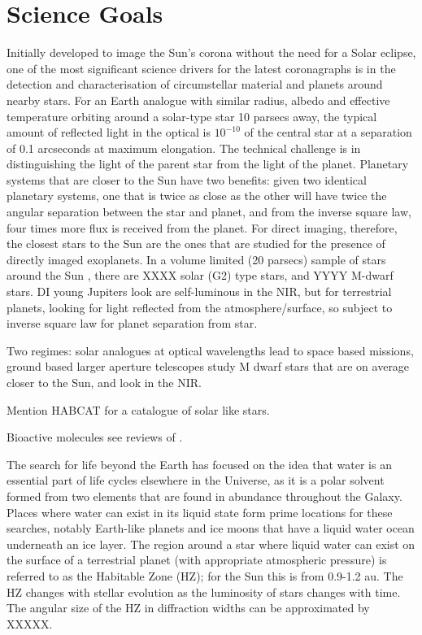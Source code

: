 \documentclass[letterpaper]{ar-1col}
\begin{document}
\section{Science Goals}

Initially developed to image the Sun's corona without the need for a Solar eclipse, one of the most significant science drivers for the latest coronagraphs is in the detection and characterisation of circumstellar material and planets around nearby stars.
%
%
For an Earth analogue with similar radius, albedo and effective temperature orbiting around a solar-type star 10 parsecs away, the typical amount of reflected light in the optical is $10^{-10}$ of the central star at a separation of 0.1 arcseconds at maximum elongation.
%
The technical challenge is in distinguishing the light of the parent star from the light of the planet.
Planetary systems that are closer to the Sun have two benefits: given two identical planetary systems, one that is twice as close as the other will have twice the angular separation between the star and planet, and from the inverse square law, four times more flux is received from the planet.
%
For direct imaging, therefore, the closest stars to the Sun are the ones that are studied for the presence of directly imaged exoplanets.
%
In a volume limited (20 parsecs) sample of stars around the Sun \citep{2023arXiv231203639K}, there are XXXX solar (G2) type stars, and YYYY M-dwarf stars.
%
DI young Jupiters look are self-luminous in the NIR, but for terrestrial planets, looking for light reflected from the atmosphere/surface, so subject to inverse square law for planet separation from star.


Two regimes: solar analogues at optical wavelengths lead to space based missions, ground based larger aperture telescopes study M dwarf stars that are on average closer to the Sun, and look in the NIR.

Mention HABCAT for a catalogue of solar like stars.

Bioactive molecules see reviews of \citet{2016AsBio..16..465S,2017ARAA..55..433K,2018AsBio..18..663S}.

The search for life beyond the Earth has focused on the idea that water is an essential part of life cycles elsewhere in the Universe, as it is a polar solvent formed from two elements that are found in abundance throughout the Galaxy.
%
Places where water can exist in its liquid state form prime locations for these searches, notably Earth-like planets and ice moons that have a liquid water ocean underneath an ice layer.
%
The region around a star where liquid water can exist on the surface of a terrestrial planet (with appropriate atmospheric pressure) is referred to as the Habitable Zone (HZ); for the Sun this is from 0.9-1.2 au.
%
The HZ changes with stellar evolution as the luminosity of stars changes with time.
%
The angular size of the HZ in diffraction widths can be approximated by XXXXX. 
\end{document}
